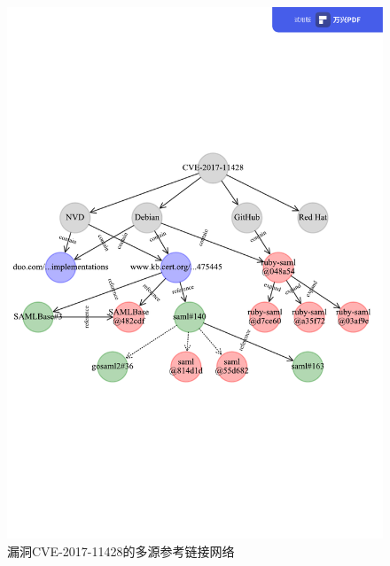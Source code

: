 \begin{figure}[!t]
    \centering
    \includegraphics[scale=0.66]{fig/network-example.pdf}
    \caption{漏洞CVE-2017-11428的多源参考链接网络}\label{fig:example}
\end{figure}

